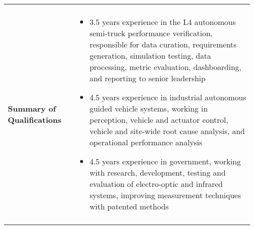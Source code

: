 \begin{tabular}{L{\lcolw}  L{\rcolw}}
 \hline \hline \\
\textbf{\Large Summary of Qualifications} &
\vspace{-0.3in} 
    \begin{itemize}[leftmargin = \itemmargin]

	\item 3.5 years experience in the L4 autonomous semi-truck performance verification, responsible for data curation, requirements generation, simulation testing, data processing, metric evaluation, dashboarding, and reporting to senior leadership
		
	\item 4.5 years experience in industrial autonomous guided vehicle systems, working in perception, vehicle and actuator control, vehicle and site-wide root cause analysis, and operational performance analysis

	\item 4.5 years experience in government, working with research, development, testing and evaluation of electro-optic and infrared systems, improving measurement techniques with patented methods
	
	\end{itemize}\\
 \hline \\ 
\end{tabular}